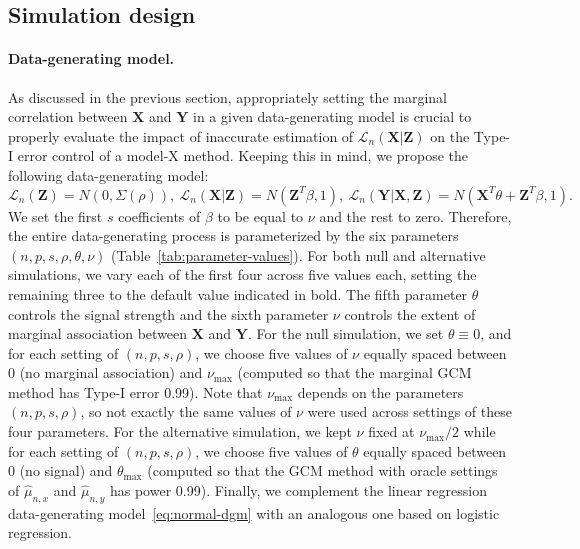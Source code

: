 \documentclass[12pt]{article}
\theoremstyle{definition}
\theoremstyle{remark}
\newcommand{\prx}{\bm X}								%
\newcommand{\prz}{\bm Z}								%
\newcommand{\pry}{{\bm Y}}								%
\newcommand{\law}{\mathcal L}							%
\begin{document}
	
	\subsection{Simulation design} \label{sec:sim-design}
	
	\paragraph{Data-generating model.} As discussed in the previous section, appropriately setting the marginal correlation between $\prx$ and $\pry$ in a given data-generating model is crucial to properly evaluate the impact of inaccurate estimation of $\law_n(\prx|\prz)$ on the Type-I error control of a model-X method. Keeping this in mind, we propose the following data-generating model:
	\begin{equation}
		\law_n(\prz) = N(0, \Sigma(\rho)),\ \law_n(\prx | \prz) = N(\prz^T \beta, 1), \ \law_n(\pry|\prx,\prz) = N(\prx^T \theta + \prz^T \beta, 1).
		\label{eq:normal-dgm}
	\end{equation}
	We set the first $s$ coefficients of $\beta$ to be equal to $\nu$ and the rest to zero. Therefore, the entire data-generating process is parameterized by the six parameters $(n, p, s, \rho, \theta, \nu)$ (Table~\ref{tab:parameter-values}). For both null and alternative simulations, we vary each of the first four across five values each, setting the remaining three to the default value indicated in bold. The fifth parameter $\theta$ controls the signal strength and the sixth parameter $\nu$ controls the extent of marginal association between $\prx$ and $\pry$. For the null simulation, we set $\theta \equiv 0$, and for each setting of $(n, p, s, \rho)$, we choose five values of $\nu$ equally spaced between 0 (no marginal association) and $\nu_{\max}$ (computed so that the marginal GCM method has Type-I error 0.99). Note that $\nu_{\max}$ depends on the parameters $(n, p, s, \rho)$, so not exactly the same values of $\nu$ were used across settings of these four parameters. For the alternative simulation, we kept $\nu$ fixed at $\nu_{\max}/2$ while for each setting of $(n, p, s, \rho)$, we choose five values of $\theta$ equally spaced between 0 (no signal) and $\theta_{\max}$ (computed so that the GCM method with oracle settings of $\widehat \mu_{n,x}$ and $\widehat \mu_{n,y}$ has power 0.99). Finally, we complement the linear regression data-generating model~\eqref{eq:normal-dgm} with an analogous one based on logistic regression.
	
\end{document}
